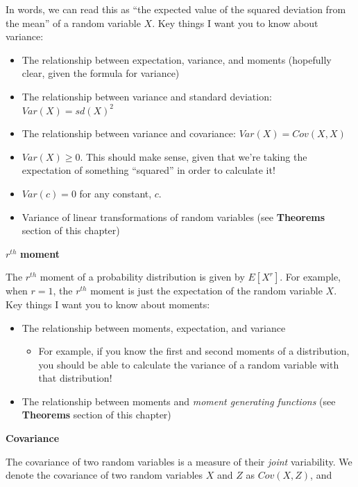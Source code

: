 \documentclass[
  letterpaper,
  DIV=11,
  numbers=noendperiod]{scrreprt}
\providecommand{\tightlist}{%
  \setlength{\itemsep}{0pt}\setlength{\parskip}{0pt}}\usepackage{longtable,booktabs,array}
\begin{document}
In words, we can read this as ``the expected value of the squared
deviation from the mean'' of a random variable \(X\). Key things I want
you to know about variance:

\begin{itemize}
\item
  The relationship between expectation, variance, and moments (hopefully
  clear, given the formula for variance)
\item
  The relationship between variance and standard deviation:
  \(Var(X) = sd(X)^2\)
\item
  The relationship between variance and covariance:
  \(Var(X) = Cov(X, X)\)
\item
  \(Var(X) \geq 0\). This should make sense, given that we're taking the
  expectation of something ``squared'' in order to calculate it!
\item
  \(Var(c) = 0\) for any constant, \(c\).
\item
  Variance of linear transformations of random variables (see
  \textbf{Theorems} section of this chapter)
\end{itemize}

\(r^{th}\) \textbf{moment}

The \(r^{th}\) moment of a probability distribution is given by
\(E[X^r]\). For example, when \(r = 1\), the \(r^{th}\) moment is just
the expectation of the random variable \(X\). Key things I want you to
know about moments:

\begin{itemize}
\item
  The relationship between moments, expectation, and variance

  \begin{itemize}
  \tightlist
  \item
    For example, if you know the first and second moments of a
    distribution, you should be able to calculate the variance of a
    random variable with that distribution!
  \end{itemize}
\item
  The relationship between moments and \emph{moment generating
  functions} (see \textbf{Theorems} section of this chapter)
\end{itemize}

\textbf{Covariance}

The covariance of two random variables is a measure of their
\emph{joint} variability. We denote the covariance of two random
variables \(X\) and \(Z\) as \(Cov(X,Z)\), and
\end{document}
